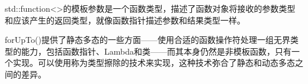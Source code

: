 std::function<>的模板参数是一个函数类型，描述了函数对象将接收的参数类型和应该产生的返回类型，就像函数指针描述参数和结果类型一样。

forUpTo()提供了静态多态的一些方面——使用合适的函数操作符处理一组无界类型的能力，包括函数指针、Lambda和类——而其本身仍然是非模板函数，只有一个实现。可以使用称为类型擦除的技术来实现，这种技术弥合了静态和动态多态之间的差异。






























